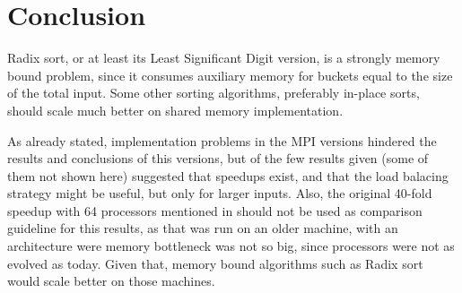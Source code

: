 \section{Conclusion}
\label{sec:conclusion}

Radix sort, or at least its Least Significant Digit version, is a strongly memory bound problem, since it consumes auxiliary memory for buckets equal to the size of the total input. Some other sorting algorithms, preferably in-place sorts, should scale much better on shared memory implementation.

As already stated, implementation problems in the MPI versions hindered the results and conclusions of this versions, but of the few results given (some of them not shown here) suggested that speedups exist, and that the load balacing strategy might be useful, but only for larger inputs. Also, the original 40-fold speedup with 64 processors mentioned in \cite{paper} should not be used as comparison guideline for this results, as that was run on an older machine, with an architecture were memory bottleneck was not so big, since processors were not as evolved as today. Given that, memory bound algorithms such as Radix sort would scale better on those machines.
